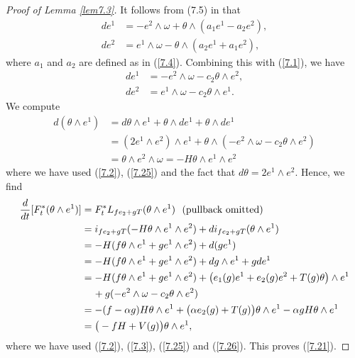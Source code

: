 \documentclass{amsart}
\theoremstyle{Corollary}
\numberwithin{equation}{section}
\begin{document}
\begin{proof}[Proof of Lemma \ref{lem7.3}]
It follows from (7.5) in \cite{CYZ} that
\begin{equation*}
\begin{split}
de^1&=-e^2\wedge\omega+\theta\wedge(a_1e^1-a_2 e^2),\\
de^2&=e^1\wedge\omega-\theta\wedge(a_2e^1+a_1 e^2), 
\end{split}
\end{equation*}  
where $a_1$ and $a_2$ are defined as in (\ref{7.4}). 
Combining this with (\ref{7.1}), we have 
\begin{equation}\label{7.25}
\begin{split}
de^1&=-e^2\wedge\omega-c_2\theta\wedge e^2,\\
de^2&=e^1\wedge\omega-c_2\theta\wedge e^1. 
\end{split}
\end{equation}  
We compute 
\begin{equation}\label{7.26}
\begin{split}
d(\theta\wedge e^1) &
=d\theta\wedge e^1+\theta\wedge de^1+\theta\wedge de^1\\
&=(2e^1\wedge e^2)\wedge e^1+\theta\wedge (-e^2\wedge\omega-c_2\theta\wedge e^2)\\
&=\theta\wedge e^2\wedge \omega=-H\theta\wedge e^1\wedge e^2
\end{split}
\end{equation}
where we have used (\ref{7.2}), (\ref{7.25}) and the fact that $d\theta=2e^1\wedge e^2$. 
Hence, we find  
\begin{equation*}
\begin{split}
\frac{d}{dt}[F_t^*(\theta\wedge e^1)]
&=F_t^*L_{fe_2+gT}(\theta\wedge e^1)~~\mbox{(pullback omitted)}\\
&=i_{fe_2+gT}(-H\theta\wedge e^1\wedge e^2)
+di_{fe_2+gT}(\theta\wedge e^1)\\
&=-H(f\theta\wedge e^1+ge^1\wedge e^2)+d(ge^1)\\
&=-H(f\theta\wedge e^1+ge^1\wedge e^2)+dg\wedge e^1+gde^1\\
&=-H(f\theta\wedge e^1+ge^1\wedge e^2)
+\big(e_1(g) e^1+e_2(g)e^2+T(g)\theta\big)\wedge e^1\\
&\hspace{4mm}+g(-e^2\wedge\omega-c_2\theta\wedge e^2)\\
&=-(f-\alpha g)H\theta\wedge e^1+\big(\alpha e_2(g)+T(g)\big)\theta\wedge e^1
-\alpha g H\theta\wedge e^1\\
&=\big(-fH+V(g)\big)\theta\wedge e^1,
\end{split}
\end{equation*}
where we have used (\ref{7.2}), (\ref{7.3}), (\ref{7.25}) and (\ref{7.26}). 
This proves (\ref{7.21}). 



\end{proof}
\end{document}
